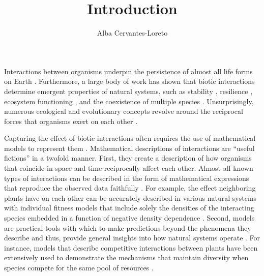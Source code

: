 \documentclass[12pt]{article}
\title{Introduction}
\author[1]{Alba Cervantes-Loreto}
\date{}
\begin{document}
\linenumbers
\baselineskip30pt
\maketitle


Interactions between organisms underpin the persistence of almost all life forms on Earth \citep{lawton1999there}. Furthermore, a large body of work has shown that biotic interactions determine emergent properties of natural systems, such as stability \citep{may1972will, wootton2016many,song2018will}, resilience \citep{capdevila2021reconciling}, ecosystem functioning \citep{turnbull2013coexistence,godoy2020excess}, and the coexistence of multiple species \citep{chesson2000mechanisms,saavedra2017structural}. Unsurprisingly, numerous ecological and evolutionary concepts revolve around the reciprocal forces that organisms exert on each other \citep{gause_experimental_1934,macarthur1967limiting,thompson1999evolution, hillerislambers2012rethinking, chase2009ecological}.

Capturing the effect of biotic interactions often requires the use of mathematical models to represent them \citep{maynard1978models}. Mathematical descriptions of interactions are ``useful fictions'' \citep{box2011statistical} in a twofold manner. First, they create a description of how organisms that coincide in space and time reciprocally affect each other. Almost all known types of interactions can be described in the form of mathematical expressions that reproduce the observed data faithfully \citep{volterra1926fluctuations,holling1959some,holt1977predation,adler2018competition,wood1999super,holland2002population,vazquez2005interaction,stouffer2021hidden} . For example, the effect neighboring plants have on each other can be accurately described in various natural systems with individual fitness models that include solely the densities of the interacting species embedded in a function of negative density dependence \citep{adler2018competition,hart2018quantify}. Second, models are practical tools with which to make predictions beyond the phenomena they describe and thus, provide general insights into how natural systems operate \citep{evans2012predictive,stouffer2019all}. For instance, models that describe competitive interactions between plants have been extensively used to demonstrate the mechanisms that maintain diversity when species compete for the same pool of resources \citep{levine2009importance,godoy_phylogenetic_2014, godoy_phenology_2014, stouffer2018cyclic,bimler_accurate_2018}.
\end{document}
